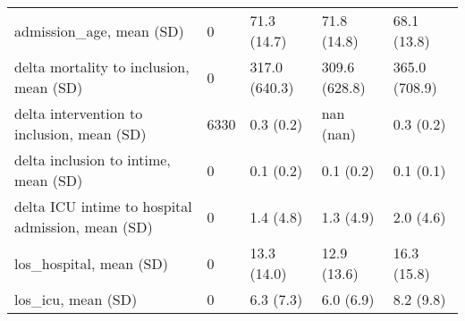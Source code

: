 \begin{tabular}{lllll}
admission\_age, mean (SD)                          &                              0 &    71.3 (14.7) &       71.8 (14.8) &            68.1 (13.8) \\
delta mortality to inclusion, mean (SD)           &                              0 &  317.0 (640.3) &     309.6 (628.8) &          365.0 (708.9) \\
delta intervention to inclusion, mean (SD)        &                           6330 &      0.3 (0.2) &         nan (nan) &              0.3 (0.2) \\
delta inclusion to intime, mean (SD)              &                              0 &      0.1 (0.2) &         0.1 (0.2) &              0.1 (0.1) \\
delta ICU intime to hospital admission, mean (SD) &                              0 &      1.4 (4.8) &         1.3 (4.9) &              2.0 (4.6) \\
los\_hospital, mean (SD)                           &                              0 &    13.3 (14.0) &       12.9 (13.6) &            16.3 (15.8) \\
los\_icu, mean (SD)                                &                              0 &      6.3 (7.3) &         6.0 (6.9) &              8.2 (9.8) \\
\bottomrule
\end{tabular}
